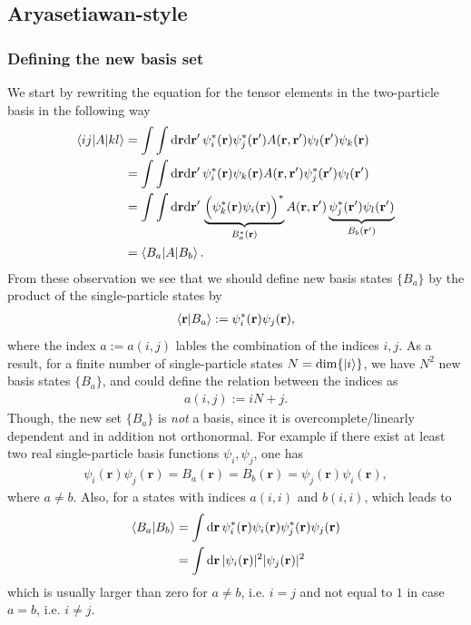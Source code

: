\documentclass[12pt,a4paper]{scrartcl}
\numberwithin{equation}{section}
\renewcommand{\vec}{\mathbf}
\begin{document}

\subsection{Aryasetiawan-style}
\subsubsection{Defining the new basis set}
We start by rewriting the equation for the tensor elements in the two-particle basis in the 
following way 
\begin{align}
 \braket{ij | A | kl }  
&= \int \int \mathrm{d}\vec{r}\mathrm{d}\vec{r}' \, \psi^*_i(\vec{r})\psi^*_j(\vec{r}') 
                                          A(\vec{r},\vec{r}') \psi_l(\vec{r}')\psi_k(\vec{r}) \\
%
&= \int \int \mathrm{d}\vec{r}\mathrm{d}\vec{r}' \, \psi^*_i(\vec{r})\psi_k(\vec{r}) 
                                          A(\vec{r},\vec{r}') \psi^*_j(\vec{r}')\psi_l(\vec{r}') \\
%
&= \int \int \mathrm{d}\vec{r}\mathrm{d}\vec{r}' \, \underbrace{ \Big( \psi^*_k(\vec{r}) \psi_i(\vec{r}) \Big)^* }_{B^*_a(\vec{r})}
                                          A(\vec{r},\vec{r}') \underbrace{ \psi^*_j(\vec{r}')\psi_l(\vec{r}') }_{B_b(\vec{r}' )} \\
&= \braket{ B_a | A | B_b } .
\end{align}
From these observation we see that we should define new basis states $\{ B_a \}$ by the product of the single-particle
states by
\begin{align}
 \braket{ \vec{r} | B_a } := \psi^*_i(\vec{r}) \psi_j(\vec{r}),
\end{align}
where the index $a:=a(i,j)$ lables the combination of the indices $i,j$. As a result, for a finite number of single-particle
states $N=\mathrm{dim}\{ \ket{i} \}$, we have $N^2$ new basis states $\{ B_a \}$, and could define the relation between the indices
as
\begin{align}
 a(i,j) := iN + j.
\end{align}
Though, the new set $\{ B_a \}$ is \textit{not} a basis, since it is overcomplete/linearly dependent and in addition not orthonormal.
For example if there exist at least two real single-particle basis functions $\psi_i,\psi_j$, one has 
\begin{align}
\psi_i(\vec{r})\psi_j(\vec{r}) = B_a(\vec{r}) = B_b(\vec{r}) = \psi_j(\vec{r})\psi_i(\vec{r}),
\end{align}
where $a\neq b$.
Also, for a states with indices $a(i,i)$ and $b(i,i)$, which leads to
\begin{align}
 \braket{B_a | B_b} &= \int \mathrm{d}\vec{r} \, \psi^*_i(\vec{r}) \psi_i(\vec{r}) \psi^*_j(\vec{r}) \psi_j(\vec{r}) \\
 &= \int \mathrm{d}\vec{r} \, |\psi_i(\vec{r})|^2 |\psi_j(\vec{r})|^2 
\end{align}
which is usually larger than zero for $a\neq b$, i.e. $i=j$ and not equal to $1$ in case $a=b$, i.e. $i\neq j$.
\end{document}
